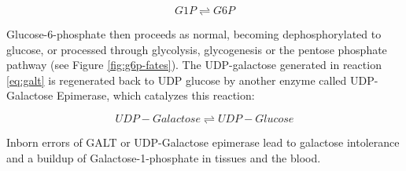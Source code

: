 \documentclass{tufte-handout}
\begin{document}
\begin{equation}
G1P \rightleftharpoons G6P
\end{equation}

Glucose-6-phosphate then proceeds as normal, becoming dephosphorylated to glucose, or processed through glycolysis, glycogenesis or the pentose phosphate pathway (see Figure \ref{fig:g6p-fates}).  The UDP-galactose generated in reaction \ref{eq:galt} is regenerated back to UDP glucose by another enzyme called UDP-Galactose Epimerase, which catalyzes this reaction:

\begin{equation}
UDP-Galactose \rightleftharpoons UDP-Glucose
\end{equation}

Inborn errors of GALT or UDP-Galactose epimerase lead to galactose intolerance and a buildup of Galactose-1-phosphate in tissues and the blood.



\end{document}
